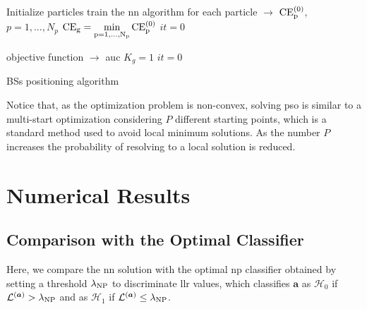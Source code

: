 \documentclass[twocolumns]{IEEEtran}
\begin{document}
 \begin{algorithm}[t]


  Initialize particles\;
  train the \ac{nn} algorithm for each particle $\to$ $\rm{CE}_p^{(0)}$, $p=1,...,N_p$\;
  $\rm{CE}_g=\underset{p=1,...,N_p}{min} \, \rm{CE}_p^{(0)}$\;
  $it = 0$\;

      
      objective function $\to$ \ac{auc}\;
      $K_g = 1$\;
      $it = 0$\;
    
\caption{BSs positioning algorithm}
 \end{algorithm}

Notice that, as the optimization problem is non-convex, solving \ac{pso} is similar to a multi-start optimization considering $P$ different starting points, which is a standard method used to avoid local minimum solutions. As the number $P$ increases the probability of resolving to a local solution is reduced.

\section{Numerical Results}\label{sec: nr}
\subsection{Comparison with the Optimal Classifier}
Here, we compare the \ac{nn} solution with the optimal \ac{np} classifier obtained by setting a threshold $\lambda_{\rm NP}$ to discriminate \ac{llr} values, which classifies $\bm{a}$ as $\mathcal{H}_0$ if $\mathcal{L}^{(\bm{a})} > \lambda_{\rm NP}$ and as $\mathcal{H}_1$ if $\mathcal{L}^{(\bm{a})} \le \lambda_{\rm NP}$.
\end{document}
